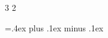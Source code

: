 \setcounter {secnumdepth} {3}
\setcounter {tocdepth} {2}

\newlength {\x}
 \x=.4ex plus .1ex minus .1ex





\newcommand {\intd}{\mspace{3mu}\mathrm{d}}

\renewcommand {\ge}  {\geqslant}
\renewcommand {\geq} {\geqslant}
\renewcommand {\le}  {\leqslant}
\renewcommand {\leq} {\leqslant}
